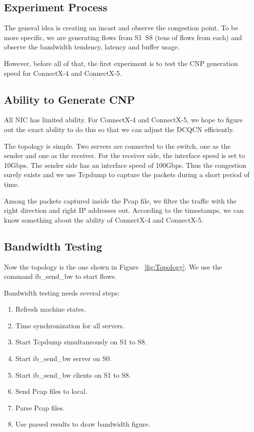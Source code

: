 \documentclass[12pt,a4paper]{article}
\begin{document}
\subsection{Experiment Process}

The general idea is creating an incast and observe the congestion point.
To be more specific, we are generating flows from S1~S8 (tens of flows from each) and observe the bandwidth tendency, latency and buffer usage.

However, before all of that, the first experiment is to test the CNP generation speed for ConnectX-4 and ConnectX-5. 

\subsection{Ability to Generate CNP}

All NIC has limited ability. For ConnectX-4 and ConnectX-5, we hope to figure out the exact ability to do this so that we can adjust the DCQCN efficiently.

The topology is simple. Two servers are connected to the switch, one as the sender and one as the receiver.
For the receiver side, the interface speed is set to 10Gbps. The sender side has an interface speed of 100Gbps.
Thus the congestion surely exists and we use Tcpdump to capture the packets during a short period of time.

Among the packets captured inside the Pcap file, we filter the traffic with the right direction and right IP addresses out.
According to the timestamps, we can know something about the ability of ConnectX-4 and ConnectX-5.

\subsection{Bandwidth Testing}

Now the topology is the one shown in Figure ~\ref{fig:Topology}.
We use the command ib\_send\_bw to start flows.

Bandwidth testing needs several steps:
\begin{enumerate}
	\item Refresh machine states.
	\item Time synchronization for all servers.
	\item Start Tcpdump simultaneously on S1 to S8.
	\item Start ib\_send\_bw server on S0.
	\item Start ib\_send\_bw clients on S1 to S8.
	\item Send Pcap files to local.
	\item Parse Pcap files.
	\item Use parsed results to draw bandwidth figure.
\end{enumerate}
\end{document}

